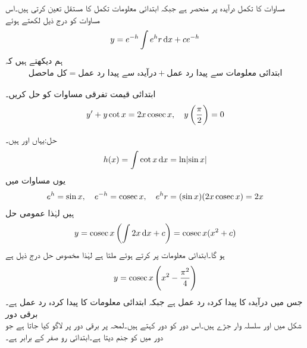 مساوات  کا تکمل درآیدہ  پر منحصر ہے جبکہ ابتدائی معلومات تکمل کا مستقل  تعین کرتی ہیں۔اس مساوات کو درج ذیل لکھتے ہوئے 
\begin{align}\label{مساوات_سادہ_اول_متجانس_خطی_حل_ب}
y=e^{-h}\int e^h r \dif x+ce^{-h}
\end{align}
ہم دیکھتے ہیں کہ
\begin{align}
\text{کل ماحصل}=\text{درآیدہ سے پیدا رد عمل}+\text{ابتدائی معلومات سے پیدا رد عمل}
\end{align}


ابتدائی قیمت تفرقی مساوات کو حل کریں۔
\begin{align*}
y'+y\cot x=2x\operatorname{cosec} x,\quad y\left(\frac{\pi}{2}\right)=0
\end{align*}

حل:یہاں  اور  ہیں۔
\begin{align*}
h(x)=\int \cot x \dif x=\ln \abs{\sin x}
\end{align*}
یوں مساوات  میں
\begin{align*}
e^h=\sin x, \quad e^{-h}=\operatorname{cosec} x, \quad e^h r= (\sin x) (2x\operatorname{cosec} x)=2x
\end{align*}
ہیں لہٰذا عمومی حل
\begin{align*}
y=\cosec x \left(\int 2x\dif x +c\right)=\cosec x (x^2+c)
\end{align*}
ہو گا۔ابتدائی معلومات پر کرتے ہوئے   ملتا ہے لہٰذا مخصوص حل درج ذیل ہے
\begin{align*}
y=\operatorname{cosec} x \left(x^2-\frac{\pi^2}{4}\right)
\end{align*}
جس میں  درآیدہ کا پیدا کردہ رد عمل ہے جبکہ  ابتدائی معلومات کا پیدا کردہ رد عمل ہے۔
 \quad برقی دور\\
شکل  میں   اور   سلسلہ وار جڑے ہیں۔اس دور کو   دور کہتے ہیں۔لمحہ  پر   برقی دور پر لاگو کیا جاتا ہے جو دور میں   کو جنم دیتا ہے۔ابتدائی رو صفر  کے برابر ہے۔

